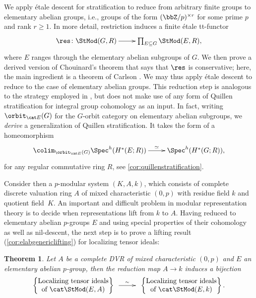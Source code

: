 \documentclass{amsart}%
\numberwithin{equation}{section}%
\newtheorem{thmx}{Theorem}
\theoremstyle{remark}
\begin{document}
We apply \'etale descent for stratification to reduce from arbitrary finite groups to elementary abelian groups, i.e., groups of the form $(\bbZ/p)^{\times r}$ for some prime $p$ and rank $r\ge 1$. In more detail, restriction induces a finite \'etale tt-functor
\[
\xymatrix{\res\colon \StMod(G,R) \ar[r] & \prod_{E \subseteq G}\StMod(E,R),}
\]
where $E$ ranges through the elementary abelian subgroups of $G$. We then prove a derived version of Chouinard's theorem \cite{Chouinard76} that says that $\res$ is conservative; here, the main ingredient is a theorem of Carlson \cite{Carlson00}. We may thus apply \'etale descent to reduce to the case of elementary abelian groups. This reduction step is analogous to the strategy employed in \cite{BensonIyengarKrause11a}, but does not make use of any form of Quillen stratification for integral group cohomology \cite{Quillen71} as an input. In fact, writing $\orbit_{\cat E}(G)$ for the $G$-orbit category on elementary abelian subgroups, we \emph{derive} a generalization of Quillen stratification. It takes the form of a homeomorphism
\[
\xymatrix{\colim_{\orbit_{\cat E}(G)}\Spec^h(H^*(E;R)) \ar[r]^-{\simeq} & \Spec^h(H^*(G;R)),}
\]
for any regular commutative ring $R$, see \cref{cor:quillenstratification}.

Consider then a $p$-modular system $(K,A,k)$, which consists of complete discrete valuation ring $A$ of mixed characteristic $(0,p)$ with residue field $k$ and quotient field~$K$. An important and difficult problem in modular representation theory is to decide when representations lift from $k$ to $A$. Having reduced to elementary abelian $p$-groups $E$ and using special properties of their cohomology as well as nil-descent, the next step is to prove a lifting result (\cref{cor:elabgenericlifting}) for localizing tensor ideals:

\begin{thmx}\label{thm:e}
Let $A$ be a complete DVR of mixed characteristic $(0,p)$ and $E$ an elementary abelian $p$-group, then %
the reduction map $A \to k$ induces a bijection
\begin{equation}\label{eq:introgenericlifting}
\begin{Bmatrix}
\text{Localizing tensor ideals} \\
\text{of } \cat \StMod(E,A)
\end{Bmatrix} 
\xymatrix@C=2pc{ \ar[r]^-{\sim} &}
\begin{Bmatrix}
\text{Localizing tensor ideals} \\
\text{of } \cat \StMod(E,k)
\end{Bmatrix}.
\end{equation}
\end{thmx}
\end{document}
